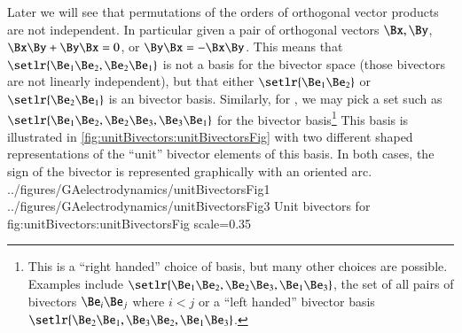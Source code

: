 Later we will see that permutations of the orders of orthogonal vector products are not independent.
In particular
given a pair of orthogonal vectors \( \Bx, \By \),
\(\Bx \By + \By \Bx = 0 \),
or \( \By \Bx = - \Bx \By \).  This means that \( \setlr{ \Be_1 \Be_2, \Be_2 \Be_1 } \) is not a basis for the  bivector space (those bivectors are not linearly independent), but that either \( \setlr{ \Be_1 \Be_2 } \) or \( \setlr{ \Be_2 \Be_1 } \) is an  bivector basis.
Similarly, for , we may pick a set such as \( \setlr{ \Be_1 \Be_2, \Be_2 \Be_3, \Be_3 \Be_1 } \) for the bivector basis\footnote{This is a ``right handed'' choice of basis, but many other choices are possible.  Examples include \( \setlr{ \Be_1 \Be_2, \Be_2 \Be_3, \Be_1 \Be_3 } \), the set of all pairs of bivectors \( \Be_i \Be_j \) where \( i < j \) or a ``left handed'' bivector basis
\( \setlr{ \Be_2 \Be_1, \Be_3 \Be_2, \Be_1 \Be_3 } \).}
This basis is illustrated in
\cref{fig:unitBivectors:unitBivectorsFig} with two different shaped representations of the ``unit'' bivector elements of this basis.
In both cases, the sign of the bivector is represented graphically with an oriented arc.
\imageTwoFigures
{../figures/GAelectrodynamics/unitBivectorsFig1}
{../figures/GAelectrodynamics/unitBivectorsFig3}
{Unit bivectors for }
{fig:unitBivectors:unitBivectorsFig}
{scale=0.35}


